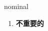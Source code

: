 
\begin{frame}
{\huge nominal}
\begin{center}
\begin{enumerate}\Large
  \item \textbf{不重要的}
\end{enumerate}
\end{center}
\end{frame}
